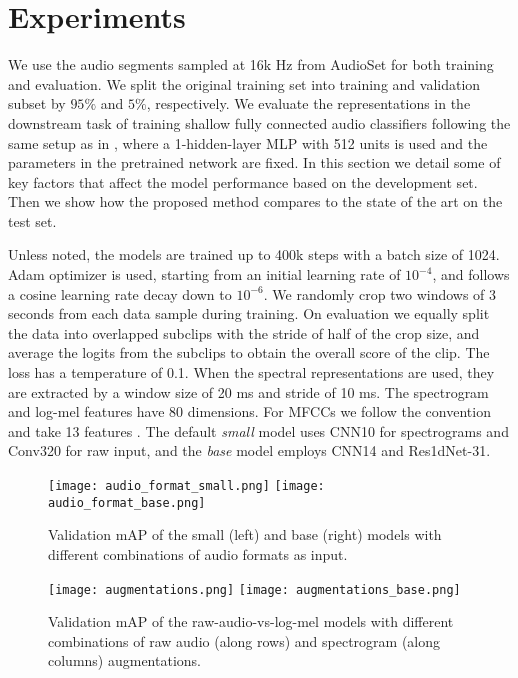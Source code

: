 \documentclass{article}
\begin{document}
\section{Experiments}
\label{experiments}

We use the audio segments sampled at 16k Hz from AudioSet \cite{gemmeke2017audio} for both training and evaluation. We split the original training set into training and validation subset by $95\%$ and $5\%$, respectively. We evaluate the representations in the downstream task of training shallow fully connected audio classifiers following the same setup as in \cite{jansen2018unsupervised, jansen2019coincidence}, where a 1-hidden-layer MLP with 512 units is used and the parameters in the pretrained network are fixed. In this section we detail some of key factors that affect the model performance based on the development set. Then we show how the proposed method compares to the state of the art on the test set. 



Unless noted, the models are trained up to 400k steps with a batch size of 1024. Adam optimizer is used, starting from an initial learning rate of $10^{-4}$, and follows a cosine learning rate decay down to $10^{-6}$. We randomly crop two windows of 3 seconds from each data sample during training. On evaluation we equally split the data into overlapped subclips with the stride of half of the crop size, and average the logits from the subclips to obtain the overall score of the clip. The loss has a temperature of 0.1. When the spectral representations are used, they are extracted by a window size of 20 ms and stride of 10 ms. The spectrogram and log-mel features have 80 dimensions. For MFCCs we follow the convention and take 13 features \cite{jurafsky2008speech}. The default \emph{small} model uses CNN10 for spectrograms and Conv320 for raw input, and the \emph{base} model employs CNN14 and Res1dNet-31.

\begin{figure}[t]
  \centering
  \texttt{[image: audio\_format\_small.png]}
  \texttt{[image: audio\_format\_base.png]}
  \caption{Validation mAP of the small (left) and base (right) models with different combinations of audio formats as input.}
  \label{fig:audio_formats}
\end{figure}

\begin{figure}[t]
  \centering
  \texttt{[image: augmentations.png]}
  \texttt{[image: augmentations\_base.png]}
  \caption{Validation mAP of the raw-audio-vs-log-mel models with different combinations of raw audio (along rows) and spectrogram (along columns) augmentations.}
  \label{fig:augmentations}
\end{figure}
\end{document}
